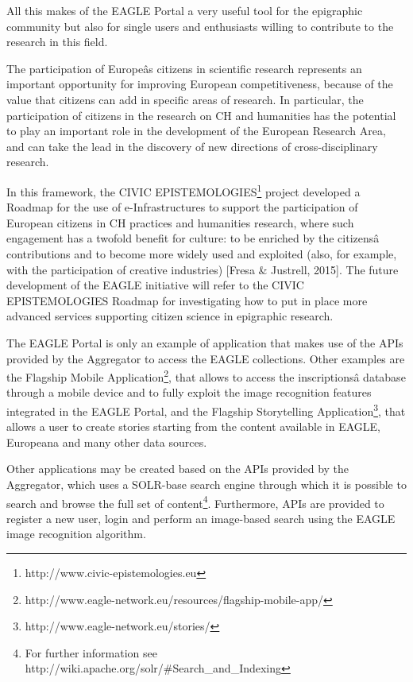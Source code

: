 All this makes of the EAGLE Portal a very useful tool for the epigraphic community but also for single users and
enthusiasts willing to contribute to the research in this field.

The participation of Europeâs citizens in scientific research represents an important opportunity for improving European
competitiveness, because of the value that citizens can add in specific areas of research. In particular, the
participation of citizens in the research on CH and humanities has the potential to play an important role in the
development of the European Research Area, and can take the lead in the discovery of new directions of
cross-disciplinary research.

In this framework, the CIVIC EPISTEMOLOGIES\footnote{ http://www.civic-epistemologies.eu } project developed a Roadmap
for the use of e-Infrastructures to support the participation of European citizens in CH practices and humanities
research, where such engagement has a twofold benefit for culture: to be enriched by the citizensâ contributions and to
become more widely used and exploited (also, for example, with the participation of creative industries) [Fresa \&
Justrell, 2015]. The future development of the EAGLE initiative will refer to the CIVIC EPISTEMOLOGIES Roadmap for
investigating how to put in place more advanced services supporting citizen science in epigraphic research.

The EAGLE Portal is only an example of application that makes use of the APIs provided by the Aggregator to access the
EAGLE collections. Other examples are the Flagship Mobile Application\footnote{
http://www.eagle-network.eu/resources/flagship-mobile-app/ }, that allows to access the inscriptionsâ database through
a mobile device and to fully exploit the image recognition features integrated in the EAGLE Portal, and the Flagship
Storytelling Application\footnote{ http://www.eagle-network.eu/stories/ }, that allows a user to create stories
starting from the content available in EAGLE, Europeana and many other data sources.

Other applications may be created based on the APIs provided by the Aggregator, which uses a SOLR-base search engine
through which it is possible to search and browse the full set of content\footnote{ For further information see
http://wiki.apache.org/solr/\#Search\_and\_Indexing }. Furthermore, APIs are provided to register a new user, login and
perform an image-based search using the EAGLE image recognition algorithm.


\bigskip



\bigskip
